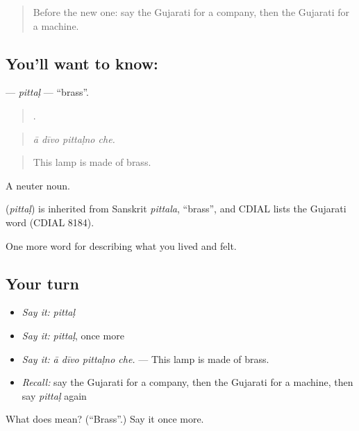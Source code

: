 \begin{quote}
Before the new one: say the Gujarati for a company, then the Gujarati for a machine.
\end{quote}

\subsection*{You'll want to know: }
\textbf{} — \emph{pittaḷ} — \textquotedblleft{}brass\textquotedblright{}.

\begin{quote}
   .
\end{quote}

\begin{quote}
\emph{ā dīvo pittaḷno che.}
\end{quote}

\begin{quote}
This lamp is made of brass.
\end{quote}

A neuter noun.

\begin{cousinweb}
\textbf{} (\emph{pittaḷ}) is inherited from Sanskrit \emph{pittala}, \textquotedblleft{}brass\textquotedblright{}, and CDIAL lists the Gujarati word (CDIAL 8184).
\end{cousinweb}

\begin{grammarlens}[title={What you've built}]
One more word for describing what you lived and felt.
\end{grammarlens}

\subsection*{Your turn}
\begin{itemize}
\raggedright
  \item \emph{Say it:} \emph{pittaḷ}
  \item \emph{Say it:} \emph{pittaḷ}, once more
  \item \emph{Say it:} \emph{ā dīvo pittaḷno che.} — This lamp is made of brass.
  \item \emph{Recall:} say the Gujarati for a company, then the Gujarati for a machine, then say \emph{pittaḷ} again
\end{itemize}

\begin{tcolorbox}[breakable,colback=teal!4,colframe=teal!35!black,title={Before you move on}]
What does  mean? (\textquotedblleft{}Brass\textquotedblright{}.) Say it once more.
\end{tcolorbox}
